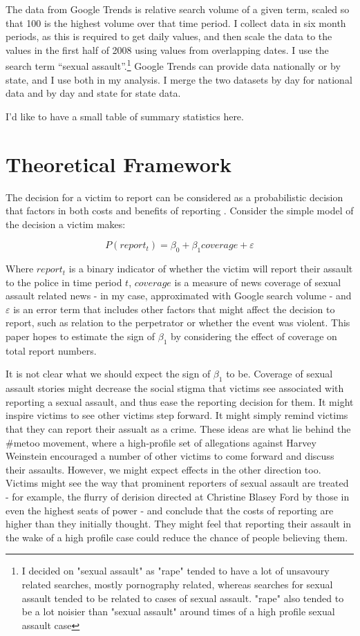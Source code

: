 \documentclass[AER,draftmode]{AEA}
\begin{document}
The data from Google Trends is relative search volume of a given term, scaled so that 100 is the highest volume over that time period. I collect data in six month periods, as this is required to get daily values, and then scale the data to the values in the first half of 2008 using values from overlapping dates. I use the search term “sexual assault”.\footnote{I decided on "sexual assault" as "rape" tended to have a lot of unsavoury related searches, mostly pornography related, whereas searches for sexual assault tended to be related to cases of sexual assault. "rape" also tended to be a lot noisier than "sexual assault" around times of a high profile sexual assault case} Google Trends can provide data nationally or by state, and I use both in my analysis. I merge the two datasets by day for national data and by day and state for state data.

I'd like to have a small table of summary statistics here.

\section{Theoretical Framework}

The decision for a victim to report can be considered as a probabilistic decision that factors in both costs and benefits of reporting \cite{allen_reporting_2007}. Consider the simple model of the decision a victim makes:

$$
P(report_t) = \beta_0 + \beta_1 coverage + \varepsilon
$$

Where $report_t$ is a binary indicator of whether the victim will report their assault to the police in time period $t$, $coverage$ is a measure of news coverage of sexual assault related news - in my case, approximated with Google search volume - and $\varepsilon$ is an error term that includes other factors that might affect the decision to report, such as relation to the perpetrator or whether the event was violent. This paper hopes to estimate the sign of $\beta_1$ by considering the effect of coverage on total report numbers. 

It is not clear what we should expect the sign of $\beta_1$ to be. Coverage of sexual assault stories might decrease the social stigma that victims see associated with reporting a sexual assault, and thus ease the reporting decision for them. It might inspire victims to see other victims step forward. It might simply remind victims that they can report their assualt as a crime. These ideas are what lie behind the \#metoo movement, where a high-profile set of allegations against Harvey Weinstein encouraged a number of other victims to come forward and discuss their assaults. However, we might expect effects in the other direction too. Victims might see the way that prominent reporters of sexual assault are treated - for example, the flurry of derision directed at Christine Blasey Ford by those in even the highest seats of power - and conclude that the costs of reporting are higher than they initially thought. They might feel that reporting their assault in the wake of a high profile case could reduce the chance of people believing them. 
\end{document}
